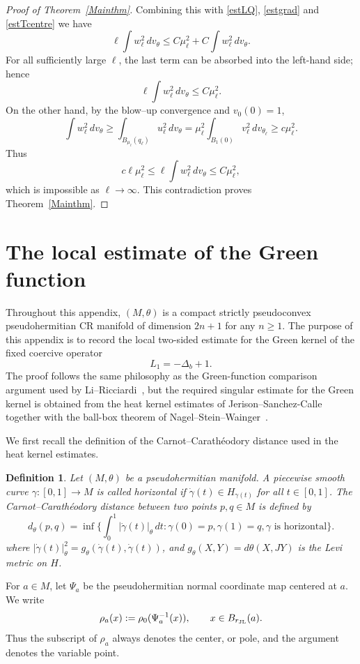 \documentclass[11pt]{article}
\numberwithin{equation}{section}
\newtheorem{definition}{Definition}[section]
\numberwithin{equation}{section}
\begin{document}
\begin{proof}[Proof of Theorem~\ref{Mainthm}]
		Combining this with \eqref{estLQ}, \eqref{estgrad} and \eqref{estTcentre} we have
		\[
		\ell \int w_\ell^2\,dv_\theta \le C \mu_\ell^2 + C \int w_\ell^2\,dv_\theta.
		\]
		For all sufficiently large \(\ell\), the last term can be absorbed into the left-hand side; hence
		\[
		\ell\int w_\ell^2\,dv_\theta\le C\mu_\ell^2 .
		\]
		On the other hand, by the blow--up convergence and \(v_0(0)=1\),
		\[
		\int w_\ell^2\,dv_\theta \ge \int_{B_{\mu_\ell}(q_\ell)}u_\ell^2\,dv_\theta = \mu_\ell^2\int_{B_1(0)}v_\ell^2\,dv_{\theta_\ell} \ge c\mu_\ell^2 .
		\]
		Thus
		\[
		c\ell\mu_\ell^2 \le \ell\int w_\ell^2\,dv_\theta \le C\mu_\ell^2,
		\]
		which is impossible as \(\ell\to\infty\). This contradiction proves Theorem~\ref{Mainthm}.
	\end{proof}
	
	\appendix
	\section{The local estimate of the Green function}\label{appendixgreen}
	Throughout this appendix, \((M,\theta)\) is a compact strictly pseudoconvex pseudohermitian CR manifold of dimension \(2n+1\)  for any $n\geq 1$. The purpose of this appendix is to record the local two-sided estimate for the Green kernel of the fixed coercive operator
	\[
	L_1=-\Delta_b+1.
	\]
	The proof follows the same philosophy as the Green-function comparison argument used by Li--Ricciardi~\cite{LR2003}, but the required singular estimate for the Green kernel is obtained from the heat kernel estimates of Jerison--Sanchez-Calle~\cite{JS1986} together with the ball-box theorem of Nagel--Stein--Wainger~\cite{NSW1985}.
	
	We first recall the definition of the Carnot--Carath\'eodory distance used in the heat kernel estimates.
	
	\begin{definition}
		Let \((M,\theta)\) be a pseudohermitian manifold. A piecewise smooth curve \(\gamma:[0,1]\to M\) is called horizontal if \(\dot{\gamma}(t)\in H_{\gamma(t)}\) for all \(t\in[0,1]\). The Carnot--Carath\'eodory distance between two points \(p,q\in M\) is defined by
		\[
		d_{\theta}(p,q)=\inf\Big\{\int_0^1|\dot{\gamma}(t)|_\theta\,dt:\gamma(0)=p,\gamma(1)=q,\gamma\text{ is horizontal}\Big\}.
		\]
		where \(|\dot{\gamma}(t)|_\theta^2=g_\theta(\dot{\gamma}(t),\dot{\gamma}(t))\), and \(g_\theta(X,Y)=d\theta(X,JY)\) is the Levi metric on \(H\).
	\end{definition}
	
	For \(a\in M\), let \(\Psi_a\) be the pseudohermitian normal coordinate map centered at \(a\).  We write
	\[
	\rho_a(x):=\rho_0(\Psi_a^{-1}(x)), \qquad x\in B_{r_{\rm JL}}(a).
	\]
	Thus the subscript of \(\rho_a\) always denotes the center, or pole, and the argument denotes the variable point.
	
\end{document}
